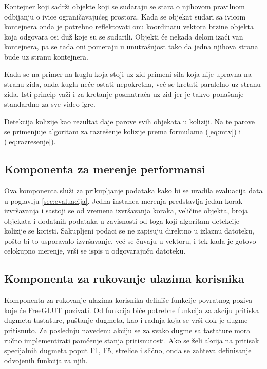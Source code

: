 \documentclass[12pt,oneside]{memoir}
\begin{document}
Kontejner koji sadrži objekte koji se sudaraju se stara o njihovom pravilnom odbijanju o ivice ograničavajućeg prostora.
Kada se objekat sudari sa ivicom kontejnera onda je potrebno reflektovati onu koordinatu vektora
brzine objekta koja odgovara osi duž koje su se sudarili.
Objekti će nekada delom izaći van kontejnera, pa se tada oni pomeraju u unutrašnjost tako da jedna njihova strana bude uz stranu kontejnera.

Kada se na primer na kuglu koja stoji uz zid primeni sila koja nije upravna na stranu zida, onda kugla neće ostati nepokretna,
već se kretati paralelno uz stranu zida. Isti princip važi i za kretanje posmatrača uz zid jer je 
takvo ponašanje standardno za sve video igre.

Detekcija kolizije kao rezultat daje parove svih objekata u koliziji. 
Na te parove se primenjuje algoritam za razrešenje kolizije prema formulama (\ref{eq:mtv}) i (\ref{eq:razresenje}).

\subsection{Komponenta za merenje performansi}
\label{sec:perf}

Ova komponenta služi za prikupljanje podataka kako bi se uradila evaluacija data u poglavlju \ref{sec:evaluacija}.
Jedna instanca merenja predstavlja jedan korak izvršavanja i sastoji se od 
vremena izvršavanja koraka, veličine objekta, broja objekata i dodatnih podataka u zavisnosti od toga 
koji algoritam detekcije kolizije se koristi. 
Sakupljeni podaci se ne zapisuju direktno u izlaznu datoteku, pošto bi 
to usporavalo izvršavanje, već se čuvaju u vektoru, 
i tek kada je gotovo celokupno merenje, vrši se ispis u odgovarajuću datoteku.

\subsection{Komponenta za rukovanje ulazima korisnika}

Komponenta za rukovanje ulazima korisnika definiše funkcije povratnog poziva koje će FreeGLUT pozivati.
Od funkcija biće potrebne funkcija za akciju pritiska dugmeta tastature, puštanje dugmeta, kao i 
radnja koja se vrši dok je dugme pritisnuto. 
Za poslednju navedenu akciju se za svako dugme sa tastature mora ručno implementirati pamćenje stanja pritisnutosti.
Ako se želi akcija na pritisak specijalnih dugmeta  
poput F1, F5, strelice i slično, onda se zahteva definisanje odvojenih funkcija za njih.
\end{document}
